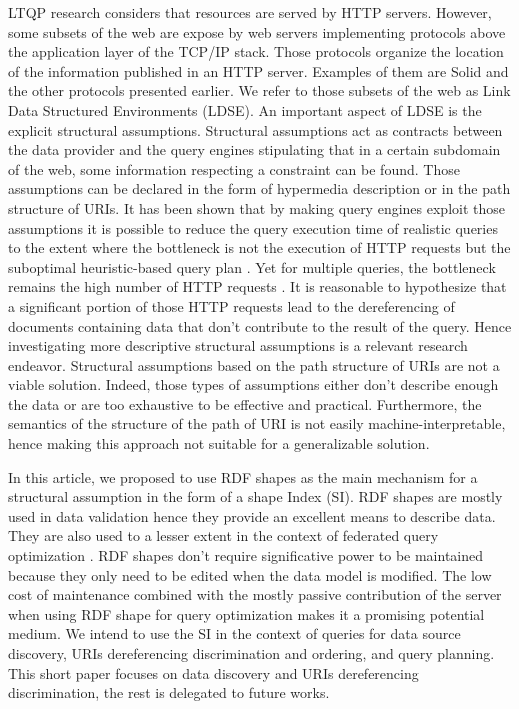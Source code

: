 LTQP research considers that resources are served by HTTP servers.
However, some subsets of the web are expose by web servers implementing protocols above the application layer of the TCP/IP stack.
Those protocols organize the location of the information published in an HTTP server.
Examples of them are Solid and the other protocols presented earlier.
We refer to those subsets of the web as Link Data Structured Environments (LDSE).
An important aspect of LDSE is the explicit structural assumptions.
Structural assumptions act as contracts between the data provider and 
the query engines stipulating that in a certain subdomain of the web, some information respecting a constraint can be found.
Those assumptions can be declared in the form of hypermedia description \cite{Fielding} or in the path structure of URIs.
It has been shown that by making query engines exploit those assumptions it is possible to reduce the query execution time
of realistic queries to the extent where the bottleneck is not the execution of 
HTTP requests but the suboptimal heuristic-based query plan \cite{eschauzier_quweda_2023, Taelman2023}.
Yet for multiple queries, the bottleneck remains the high number of HTTP requests  \cite{eschauzier_quweda_2023}.
It is reasonable to hypothesize that a significant portion of those HTTP requests lead to the dereferencing of
documents containing data that don't contribute to the result of the query.
Hence investigating more descriptive structural assumptions is a relevant research endeavor.
Structural assumptions based on the path structure of URIs are not a viable solution.
Indeed, those types of assumptions either don't describe enough the data or are too exhaustive to be effective and practical.
Furthermore, the semantics of the structure of the path of URI is not easily machine-interpretable, hence
making this approach not suitable for a generalizable solution.

In this article, we proposed to use RDF shapes as the main mechanism for a structural assumption in the form of a shape Index (SI).
RDF shapes are mostly used in data validation \cite{Gayo2018a} hence they provide an excellent means to describe data.
They are also used to a lesser extent in the context of federated query optimization \cite{kashif2021}.
RDF shapes don't require significative power to be maintained because they only need to be edited 
when the data model is modified.
The low cost of maintenance combined with the mostly passive contribution of 
the server when using RDF shape for query optimization makes it a promising potential medium. 
We intend to use the SI in the context of queries for data source discovery, URIs dereferencing discrimination and ordering, and query planning.
This short paper focuses on data discovery and URIs dereferencing discrimination,
the rest is delegated to future works.
